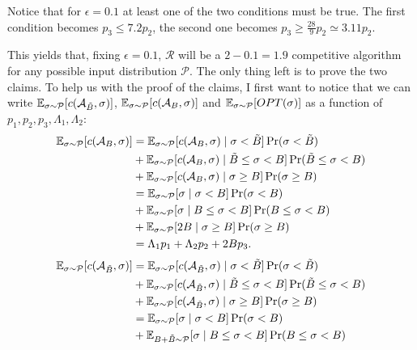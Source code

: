 \documentclass[11pt]{article}
\begin{document}
\begin{enumerate}
    Notice that for $\epsilon = 0.1$ at least one of the two conditions must be true. The first condition becomes $p_3 \leq 7.2p_2$, the second one becomes $p_3 \geq \frac{28}{9}p_2 \simeq 3.11 p_2$. 

    This yields that, fixing $\epsilon = 0.1$, $\mathcal{R}$ will be a $2-0.1 = 1.9$ competitive algorithm for any possible input distribution $\mathcal P$. The only thing left is to prove the two claims. To help us with the proof of the claims, I first want to notice that we can write $\mathbb{E}_{\sigma \sim \mathcal{P}}[c(\mathcal{A}_{\tilde{B}}, \sigma)]$, $\mathbb{E}_{\sigma \sim \mathcal{P}}[c(\mathcal{A}_B, \sigma)]$ and $\mathbb{E}_{\sigma \sim \mathcal{P}}[OPT(\sigma)]$ as a function of $p_1,p_2,p_3,\Lambda_1,\Lambda_2$:
    \begin{align*}
        \mathbb{E}_{\sigma \sim \mathcal{P}}[c(\mathcal{A}_{B}, \sigma)] & = \mathbb{E}_{\sigma \sim \mathcal{P}}[c(\mathcal{A}_{B}, \sigma)\mid \sigma < \tilde B]\Pr(\sigma < \tilde B) \\ 
        &+ \mathbb{E}_{\sigma \sim \mathcal{P}}[c(\mathcal{A}_{B}, \sigma)\mid  \tilde B \leq \sigma < B]\Pr( \tilde B \leq \sigma < B) \\
        &+\mathbb{E}_{\sigma \sim \mathcal{P}}[c(\mathcal{A}_{B}, \sigma)\mid \sigma \geq B]\Pr( \sigma \geq B) \\
        &=\mathbb{E}_{\sigma \sim \mathcal{P}}[ \sigma \mid \sigma < B]\Pr(\sigma < B) \\ 
        &+\mathbb{E}_{\sigma \sim \mathcal{P}}[\sigma \mid B \leq \sigma < B]\Pr( B\leq \sigma < B) \\
        &+\mathbb{E}_{\sigma \sim \mathcal{P}}[2B \mid \sigma \geq B]\Pr( \sigma \geq B) \\
        &= \Lambda_1 p_1 + \Lambda_2 p_2 + 2Bp_3.
    \end{align*}
    \begin{align*}
        \E_{\sigma \sim \mathcal{P}}[c(\Alg_{\tilde B}, \sigma)] & = \E_{\sigma \sim \mathcal{P}}[c(\Alg_{\tilde B}, \sigma)\mid \sigma < \tilde B]\Pr(\sigma < \tilde B) \\ 
        &+ \E_{\sigma \sim \mathcal{P}}[c(\Alg_{\tilde B}, \sigma)\mid  \tilde B \leq \sigma < B]\Pr( \tilde B \leq \sigma < B) \\
        &+\E_{\sigma \sim \mathcal{P}}[c(\Alg_{\tilde B}, \sigma)\mid \sigma \geq B]\Pr( \sigma \geq B) \\
        &=\E_{\sigma \sim \mathcal{P}}[ \sigma \mid \sigma < B]\Pr(\sigma < B) \\ 
        &+\E_{B + \tilde B \sim \mathcal{P}}[\sigma \mid B \leq \sigma < B]\Pr( B\leq \sigma < B) \\

\end{align*}
\end{enumerate}
\end{document}
